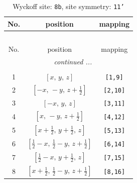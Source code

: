 \documentclass[fleqn,8pt]{jsarticle}
\begin{document}
\begin{longtable}{ccc}
\caption{Wyckoff site: {\tt 8b}, site symmetry: {\tt 11'}}
 \\
 \hline \hline
No. & position & mapping \\ \hline \endfirsthead

\multicolumn{2}{l}{\tablename\ \thetable{}} \\
 \hline \hline
No. & position & mapping \\ \hline \endhead

 \hline \hline
\multicolumn{2}{r}{\footnotesize\it continued ...} \\ \endfoot

 \hline \hline
\multicolumn{2}{r}{} \\ \endlastfoot

1 & $\left[ x,\, y,\, z \right]$ & {\tt [1,9]} \\ \hline
2 & $\left[ - x,\, - y,\, z + \frac{1}{2} \right]$ & {\tt [2,10]} \\ \hline
3 & $\left[ - x,\, y,\, z \right]$ & {\tt [3,11]} \\ \hline
4 & $\left[ x,\, - y,\, z + \frac{1}{2} \right]$ & {\tt [4,12]} \\ \hline
5 & $\left[ x + \frac{1}{2},\, y + \frac{1}{2},\, z \right]$ & {\tt [5,13]} \\ \hline
6 & $\left[ \frac{1}{2} - x,\, \frac{1}{2} - y,\, z + \frac{1}{2} \right]$ & {\tt [6,14]} \\ \hline
7 & $\left[ \frac{1}{2} - x,\, y + \frac{1}{2},\, z \right]$ & {\tt [7,15]} \\ \hline
8 & $\left[ x + \frac{1}{2},\, \frac{1}{2} - y,\, z + \frac{1}{2} \right]$ & {\tt [8,16]} \\
\end{longtable}
\end{document}
